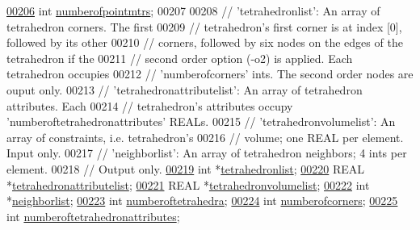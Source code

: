 \begin{DoxyCode}
\hypertarget{tetgen_8h_source.tex_l00206}{}\hyperlink{classtetgenio_a1a62cf8c03758eb3e1920c6c506c1a64}{00206}   \textcolor{keywordtype}{int} \hyperlink{classtetgenio_a1a62cf8c03758eb3e1920c6c506c1a64}{numberofpointmtrs};
00207  
00208   \textcolor{comment}{// 'tetrahedronlist':  An array of tetrahedron corners.  The first }
00209   \textcolor{comment}{//   tetrahedron's first corner is at index [0], followed by its other }
00210   \textcolor{comment}{//   corners, followed by six nodes on the edges of the tetrahedron if the}
00211   \textcolor{comment}{//   second order option (-o2) is applied. Each tetrahedron occupies}
00212   \textcolor{comment}{//   'numberofcorners' ints.  The second order nodes are ouput only. }
00213   \textcolor{comment}{// 'tetrahedronattributelist':  An array of tetrahedron attributes.  Each}
00214   \textcolor{comment}{//   tetrahedron's attributes occupy 'numberoftetrahedronattributes' REALs.}
00215   \textcolor{comment}{// 'tetrahedronvolumelist':  An array of constraints, i.e. tetrahedron's}
00216   \textcolor{comment}{//   volume; one REAL per element.  Input only.}
00217   \textcolor{comment}{// 'neighborlist':  An array of tetrahedron neighbors; 4 ints per element. }
00218   \textcolor{comment}{//   Output only.}
\hypertarget{tetgen_8h_source.tex_l00219}{}\hyperlink{classtetgenio_ae53a07184487b2635d0f332ff818d938}{00219}   \textcolor{keywordtype}{int}  *\hyperlink{classtetgenio_ae53a07184487b2635d0f332ff818d938}{tetrahedronlist};
\hypertarget{tetgen_8h_source.tex_l00220}{}\hyperlink{classtetgenio_aeae735f4584f63311f1c9d46530eefe1}{00220}   REAL *\hyperlink{classtetgenio_aeae735f4584f63311f1c9d46530eefe1}{tetrahedronattributelist};
\hypertarget{tetgen_8h_source.tex_l00221}{}\hyperlink{classtetgenio_a1fe58bef7f029f7b84a8541851547382}{00221}   REAL *\hyperlink{classtetgenio_a1fe58bef7f029f7b84a8541851547382}{tetrahedronvolumelist};
\hypertarget{tetgen_8h_source.tex_l00222}{}\hyperlink{classtetgenio_ab79a85fdffb1ab3f93ff3645fb604d40}{00222}   \textcolor{keywordtype}{int}  *\hyperlink{classtetgenio_ab79a85fdffb1ab3f93ff3645fb604d40}{neighborlist};
\hypertarget{tetgen_8h_source.tex_l00223}{}\hyperlink{classtetgenio_ad9a3fc307214cd459ca367c55d4bc16d}{00223}   \textcolor{keywordtype}{int} \hyperlink{classtetgenio_ad9a3fc307214cd459ca367c55d4bc16d}{numberoftetrahedra};
\hypertarget{tetgen_8h_source.tex_l00224}{}\hyperlink{classtetgenio_a7d31410cbdcf2c1557ae7c1148c2eed7}{00224}   \textcolor{keywordtype}{int} \hyperlink{classtetgenio_a7d31410cbdcf2c1557ae7c1148c2eed7}{numberofcorners};
\hypertarget{tetgen_8h_source.tex_l00225}{}\hyperlink{classtetgenio_ac22e481bf9a3662b173599914a696f7a}{00225}   \textcolor{keywordtype}{int} \hyperlink{classtetgenio_ac22e481bf9a3662b173599914a696f7a}{numberoftetrahedronattributes};

\end{DoxyCode}
